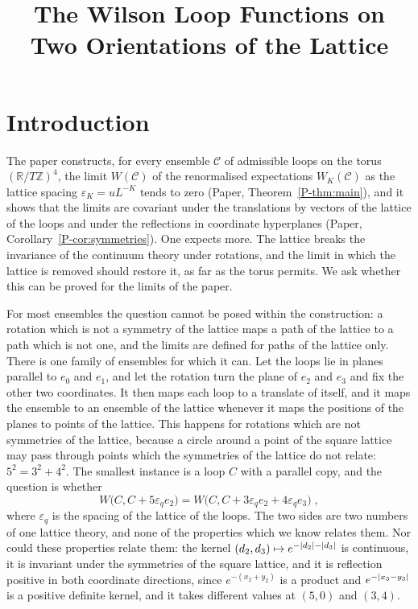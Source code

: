 \documentclass[11pt]{preprint}
\title{The Wilson Loop Functions on Two Orientations of the Lattice}
\author{}
\date{}
\DeclarePairedDelimiter{\abs}{\lvert}{\rvert}
\numberwithin{equation}{section}
\theoremstyle{definition}
\theoremstyle{remark}
\theoremstyle{plain}
\begin{document}
\maketitle

\section{Introduction}\label{sec:introduction}

The paper constructs, for every ensemble $\mathcal C$ of admissible loops on the torus $(\mathbb R/T\mathbb Z)^4$, the limit $W(\mathcal C)$ of the renormalised expectations $W_K(\mathcal C)$ as the lattice spacing $\varepsilon_K = uL^{-K}$ tends to zero (Paper, Theorem~\ref{P-thm:main}), and it shows that the limits are covariant under the translations by vectors of the lattice of the loops and under the reflections in coordinate hyperplanes (Paper, Corollary~\ref{P-cor:symmetries}). One expects more. The lattice breaks the invariance of the continuum theory under rotations, and the limit in which the lattice is removed should restore it, as far as the torus permits. We ask whether this can be proved for the limits of the paper.

For most ensembles the question cannot be posed within the construction: a rotation which is not a symmetry of the lattice maps a path of the lattice to a path which is not one, and the limits are defined for paths of the lattice only. There is one family of ensembles for which it can. Let the loops lie in planes parallel to $e_0$ and $e_1$, and let the rotation turn the plane of $e_2$ and $e_3$ and fix the other two coordinates. It then maps each loop to a translate of itself, and it maps the ensemble to an ensemble of the lattice whenever it maps the positions of the planes to points of the lattice. This happens for rotations which are not symmetries of the lattice, because a circle around a point of the square lattice may pass through points which the symmetries of the lattice do not relate: $5^2 = 3^2 + 4^2$. The smallest instance is a loop $C$ with a parallel copy, and the question is whether
\begin{equation}\label{eq:target}
    W\bigl(C, C + 5\varepsilon_qe_2\bigr) = W\bigl(C, C + 3\varepsilon_qe_2 + 4\varepsilon_qe_3\bigr)\;,
\end{equation}
where $\varepsilon_q$ is the spacing of the lattice of the loops. The two sides are two numbers of one lattice theory, and none of the properties which we know relates them. Nor could these properties relate them: the kernel $(d_2, d_3) \mapsto e^{-\abs{d_2} - \abs{d_3}}$ is continuous, it is invariant under the symmetries of the square lattice, and it is reflection positive in both coordinate directions, since $e^{-(x_2 + y_2)}$ is a product and $e^{-\abs{x_3 - y_3}}$ is a positive definite kernel, and it takes different values at $(5, 0)$ and $(3, 4)$.
\end{document}
